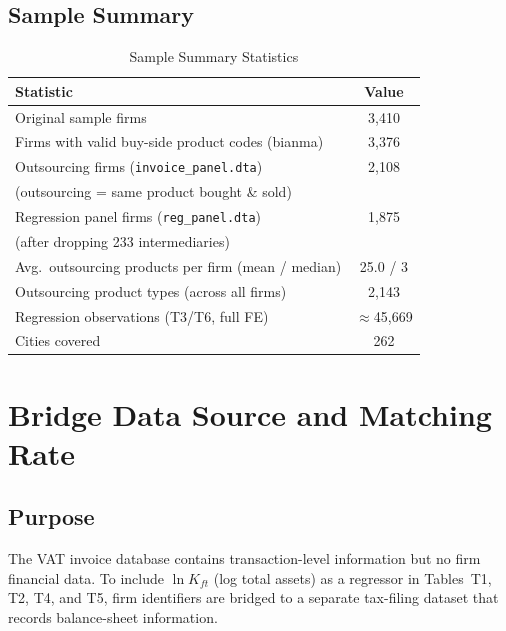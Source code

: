 \documentclass[12pt]{article}
\begin{document}
\subsection*{Sample Summary}

\begin{table}[H]
  \centering
  \caption{Sample Summary Statistics}
  \label{tab:sample_summary}
  \begin{tabular}{lc}
    \toprule
    Statistic & Value \\
    \midrule
    Original sample firms                                      & 3,410 \\
    Firms with valid buy-side product codes (bianma)           & 3,376 \\
    Outsourcing firms (\texttt{invoice\_panel.dta})            & 2,108 \\
    \quad (outsourcing = same product bought \& sold)          & \\
    Regression panel firms (\texttt{reg\_panel.dta})           & 1,875 \\
    \quad (after dropping 233 intermediaries)                  & \\
    Avg.\ outsourcing products per firm (mean / median)        & 25.0 / 3 \\
    Outsourcing product types (across all firms)               & 2,143 \\
    Regression observations (T3/T6, full FE)                   & $\approx$45,669 \\
    Cities covered                                             & 262 \\
    \bottomrule
  \end{tabular}
\end{table}

\section{Bridge Data Source and Matching Rate}
\label{sec:bridge}

\subsection*{Purpose}

The VAT invoice database contains transaction-level information but no firm
financial data. To include \(\ln K_{ft}\) (log total assets) as a regressor in
Tables~T1, T2, T4, and T5, firm identifiers are bridged to a separate tax-filing
dataset that records balance-sheet information.
\end{document}
